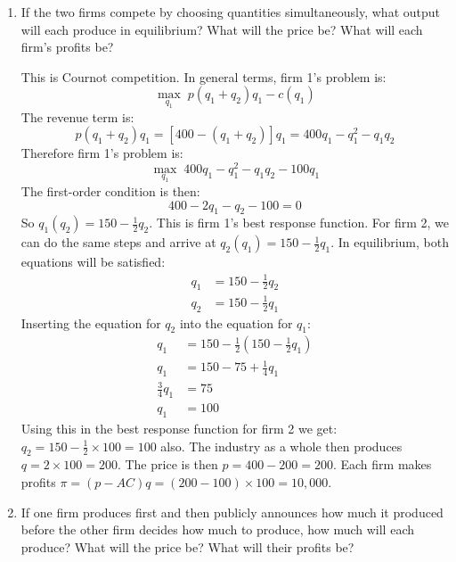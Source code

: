 \documentclass[12pt]{article}
\newcounter{question}[section]
\newenvironment{subquestions}{
  \begin{enumerate}[label=(\roman*)]}{\end{enumerate}}
\begin{document}
\begin{subquestions}
  \item If the two firms compete by choosing quantities simultaneously, what
    output will each produce in equilibrium?  What will the price be? What will
    each firm's profits be?

  \textcolor{solution-color}{
      This is Cournot competition.
      In general terms, firm 1's problem is:
      \[
        \underset{q_1}{\max}\; p\left( q_1+q_2 \right)q_1 - c\left( q_1
        \right)
      \]
      The revenue term is:
      \[
        p\left( q_1+q_2 \right)q_1=\left[ 400-\left( q_1+q_2
      \right) \right]q_1= 400q_1 - q_1^2 -q_1q_2
      \]
      Therefore firm 1's problem is:
      \[
        \underset{q_1}{\max}\;  400q_1 -q_1^2 - q_1q_2 - 100q_1
      \]
      The first-order condition is then:
      \[
        400-2q_1 -q_2 -100 =0
      \]
      So $q_1\left( q_2 \right) = 150 - \frac{1}{2}q_2$. This is firm 1's best
      response function.
      For firm 2, we can do the same steps and arrive at $q_2\left( q_1
      \right) =
      150-\frac{1}{2}q_1$.
      In equilibrium, both equations will be satisfied:
      \begin{align*}
        q_1&=150-\frac{1}{2}q_2 \\
        q_2&= 150-\frac{1}{2}q_1
      \end{align*}
      Inserting the equation for $q_2$ into the equation for $q_1$:
      \begin{align*}
        q_1 &= 150-\frac{1}{2}\left( 150 - \frac{1}{2}q_1 \right) \\
        q_1 &= 150 - 75 + \frac{1}{4}q_1 \\
        \frac{3}{4}q_1 &= 75 \\
        q_1 &=100
      \end{align*}
      Using this in the best response function for firm 2 we get:
      $q_2=150-\frac{1}{2}\times100
      =100$ also. The industry as a whole then
      produces $q=2\times 100=200$. The price is then
      $p=400-200=200$.
      Each firm makes profits $\pi=\left( p-AC \right)q=\left(
      200-100\right)\times 100 = 10,000$.
  }
  \item If one firm produces first and then publicly announces how much it
    produced before the other firm decides how much to produce, how much will
    each produce? What will the price be? What will their profits be?


\end{subquestions}
\end{document}
